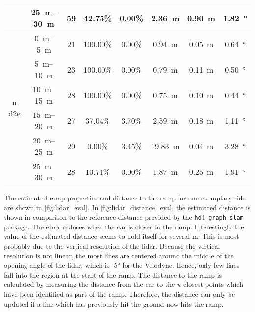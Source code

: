 \begin{table}[htbp]
\begin{tabular}[t]{cccccccc}
		                       & \SIrange{25}{30}{\metre} & 59              & 42.75\%        & 0.00\%         & \SI{2.36}{\metre}  & \SI{0.90}{\metre} & \SI{1.82}{\degree}     \\
		\hline
		\multirow{6}{*}{u d2e} & \SIrange{0}{5}{\metre}   & 21              & 100.00\%       & 0.00\%         & \SI{0.94}{\metre}  & \SI{0.05}{\metre} & \SI{0.64}{\degree}     \\
		                       & \SIrange{5}{10}{\metre}  & 23              & 100.00\%       & 0.00\%         & \SI{0.79}{\metre}  & \SI{0.11}{\metre} & \SI{0.50}{\degree}     \\
		                       & \SIrange{10}{15}{\metre} & 28              & 100.00\%       & 0.00\%         & \SI{0.75}{\metre}  & \SI{0.10}{\metre} & \SI{0.44}{\degree}     \\
		                       & \SIrange{15}{20}{\metre} & 27              & 37.04\%        & 3.70\%         & \SI{2.59}{\metre}  & \SI{0.18}{\metre} & \SI{1.11}{\degree}     \\
		                       & \SIrange{20}{25}{\metre} & 29              & 0.00\%         & 3.45\%         & \SI{19.83}{\metre} & \SI{0.04}{\metre} & \SI{3.28}{\degree}     \\
		                       & \SIrange{25}{30}{\metre} & 28              & 10.71\%        & 0.00\%         & \SI{1.87}{\metre}  & \SI{0.25}{\metre} & \SI{1.91}{\degree}     \\
		\bottomrule
	\end{tabular}
\end{table}
The estimated ramp properties and distance to the ramp for one exemplary ride are shown in \cref{fig:lidar_eval}.
In \cref{fig:lidar_distance_eval} the estimated distance is shown in comparison to the reference distance provided by the \texttt{hdl\_graph\_slam} package.
The error reduces when the car is closer to the ramp.
Interestingly the value of the estimated distance seems to hold itself for several \si{\metre}.
This is most probably due to the vertical resolution of the \gls{lidar}.
Because the vertical resolution is not linear, the most lines are centered around the middle of the opening angle of the \gls{lidar}, which is -\ang{5} for the Velodyne.
Hence, only few lines fall into the region at the start of the ramp.
The distance to the ramp is calculated by measuring the distance from the car to the $n$ closest points which have been identified as part of the ramp.
Therefore, the distance can only be updated if a line which has previously hit the ground now hits the ramp.\\
